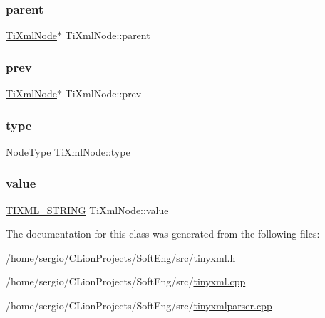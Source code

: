 \mbox{\label{class_ti_xml_node_a662c4de61244e4fa5bd4e2d8c63143a5}} 
\subsubsection{\texorpdfstring{parent}{parent}}
{\footnotesize\ttfamily \hyperlink{class_ti_xml_node}{Ti\+Xml\+Node}$\ast$ Ti\+Xml\+Node\+::parent\hspace{0.3cm}{\ttfamily [protected]}}

\mbox{\label{class_ti_xml_node_a9c5370ea2cbfd9f0e0f7b30a57fd68f5}} 
\subsubsection{\texorpdfstring{prev}{prev}}
{\footnotesize\ttfamily \hyperlink{class_ti_xml_node}{Ti\+Xml\+Node}$\ast$ Ti\+Xml\+Node\+::prev\hspace{0.3cm}{\ttfamily [protected]}}

\mbox{\label{class_ti_xml_node_a2619c6379181c16ba95ae6922e2ca839}} 
\subsubsection{\texorpdfstring{type}{type}}
{\footnotesize\ttfamily \hyperlink{class_ti_xml_node_a836eded4920ab9e9ef28496f48cd95a2}{Node\+Type} Ti\+Xml\+Node\+::type\hspace{0.3cm}{\ttfamily [protected]}}

\mbox{\label{class_ti_xml_node_aead528b3cedc33c16a6c539872c7cc8b}} 
\subsubsection{\texorpdfstring{value}{value}}
{\footnotesize\ttfamily \hyperlink{tinyxml_8h_a92bada05fd84d9a0c9a5bbe53de26887}{T\+I\+X\+M\+L\+\_\+\+S\+T\+R\+I\+NG} Ti\+Xml\+Node\+::value\hspace{0.3cm}{\ttfamily [protected]}}



The documentation for this class was generated from the following files\+:\begin{DoxyCompactItemize}
\item 
/home/sergio/\+C\+Lion\+Projects/\+Soft\+Eng/src/\hyperlink{tinyxml_8h}{tinyxml.\+h}\item 
/home/sergio/\+C\+Lion\+Projects/\+Soft\+Eng/src/\hyperlink{tinyxml_8cpp}{tinyxml.\+cpp}\item 
/home/sergio/\+C\+Lion\+Projects/\+Soft\+Eng/src/\hyperlink{tinyxmlparser_8cpp}{tinyxmlparser.\+cpp}\end{DoxyCompactItemize}
